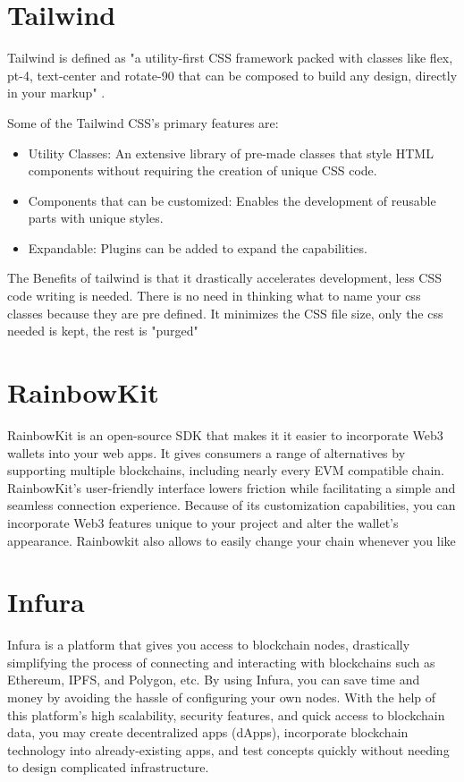 \section{Tailwind}
\label{sec:ch3sec5}
Tailwind is defined as "a utility-first CSS framework packed with classes like flex, pt-4, text-center and rotate-90 that can be composed to build any design, directly in your markup" \cite{tailwind}.

Some of the Tailwind CSS's primary features are:
\begin{itemize}
\item Utility Classes: An extensive library of pre-made classes that style HTML components without requiring the creation of unique CSS code.
\item Components that can be customized: Enables the development of reusable parts with unique styles.
\item Expandable: Plugins can be added to expand the capabilities.
\end{itemize}
The Benefits of tailwind is that it drastically accelerates development, less CSS code writing is needed. There is no need in thinking what to name your css classes because they are pre defined. It minimizes the CSS file size, only the css needed is kept, the rest is "purged"

\section{RainbowKit}
\label{sec:ch3sec6}
RainbowKit is an open-source SDK that makes it it easier to incorporate Web3 wallets into your web apps. It gives consumers a range of alternatives by supporting multiple blockchains, including nearly every EVM compatible chain. RainbowKit's user-friendly interface lowers friction while facilitating a simple and seamless connection experience. Because of its customization capabilities, you can incorporate Web3 features unique to your project and alter the wallet's appearance. Rainbowkit also allows to easily change your chain whenever you like \cite{rainbowkit}

\section{Infura}
\label{sec:ch3sec7}
Infura is a platform that gives you access to blockchain nodes, drastically simplifying the process of connecting and interacting with blockchains such as Ethereum, IPFS, and Polygon, etc. By using Infura, you can save time and money by avoiding the hassle of configuring your own nodes. With the help of this platform's high scalability, security features, and quick access to blockchain data, you may create decentralized apps (dApps), incorporate blockchain technology into already-existing apps, and test concepts quickly without needing to design complicated infrastructure. \cite{infura}

